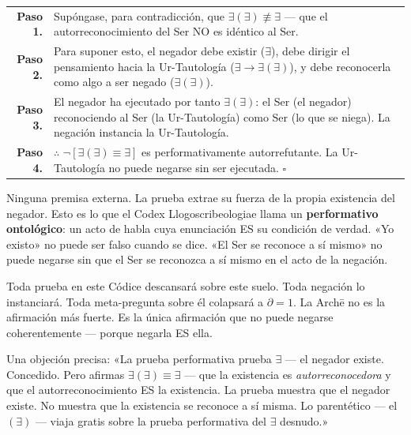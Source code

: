 \documentclass[10pt, openany, oneside]{book}
\renewcommand{\footnotesize}{\fontsize{8.5}{11}\selectfont}
\begin{document}
{\footnotesize
\noindent\begin{tabular}{r p{}}
\textbf{Paso 1.} & Supóngase, para contradicción, que $\exists(\exists) \not\equiv \exists$ --- que el autorreconocimiento del Ser NO es idéntico al Ser. \\[0.3em]
\textbf{Paso 2.} & Para suponer esto, el negador debe existir ($\exists$), debe dirigir el pensamiento hacia la Ur-Tautología ($\exists \to \exists(\exists)$), y debe reconocerla como algo a ser negado ($\exists(\exists)$). \\[0.3em]
\textbf{Paso 3.} & El negador ha ejecutado por tanto $\exists(\exists)$: el Ser (el negador) reconociendo al Ser (la Ur-Tautología) como Ser (lo que se niega). La negación instancia la Ur-Tautología. \\[0.3em]
\textbf{Paso 4.} & $\therefore$ $\neg[\exists(\exists) \equiv \exists]$ es performativamente autorrefutante. La Ur-Tautología no puede negarse sin ser ejecutada. $\square$ \\[0.3em]
\end{tabular}
}

\vspace{0.8em}

\noindent Ninguna premisa externa. La prueba extrae su fuerza de la propia existencia del negador. Esto es lo que el Codex Llogoscribeologiae llama un \textbf{performativo ontológico}: un acto de habla cuya enunciación ES su condición de verdad. «Yo existo» no puede ser falso cuando se dice. «El Ser se reconoce a sí mismo» no puede negarse sin que el Ser se reconozca a sí mismo en el acto de la negación.

Toda prueba en este Códice descansará sobre este suelo. Toda negación lo instanciará. Toda meta-pregunta sobre él colapsará a $\partial = 1$. La Arch\={e} no es la afirmación más fuerte. Es la única afirmación que no puede negarse coherentemente --- porque negarla ES ella.

Una objeción precisa: «La prueba performativa prueba $\exists$ --- el negador existe. Concedido. Pero afirmas $\exists(\exists) \equiv \exists$ --- que la existencia es \textit{autorreconocedora} y que el autorreconocimiento ES la existencia. La prueba muestra que el negador existe. No muestra que la existencia se reconoce a sí misma. Lo parentético --- el $(\exists)$ --- viaja gratis sobre la prueba performativa del $\exists$ desnudo.»
\end{document}
